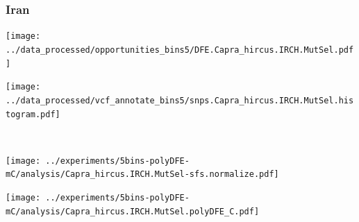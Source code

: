 \subsubsection{Iran}

\begin{minipage}{0.49\linewidth}
    \texttt{[image: ../data\_processed/opportunities\_bins5/DFE.Capra\_hircus.IRCH.MutSel.pdf]}
\end{minipage}
\begin{minipage}{0.49\linewidth}
    \texttt{[image: ../data\_processed/vcf\_annotate\_bins5/snps.Capra\_hircus.IRCH.MutSel.histogram.pdf]}
\end{minipage}
\\
\begin{minipage}{0.49\linewidth}
    \texttt{[image: ../experiments/5bins-polyDFE-mC/analysis/Capra\_hircus.IRCH.MutSel-sfs.normalize.pdf]}
\end{minipage}
\begin{minipage}{0.4\linewidth}
    \texttt{[image: ../experiments/5bins-polyDFE-mC/analysis/Capra\_hircus.IRCH.MutSel.polyDFE\_C.pdf]}
\end{minipage}

